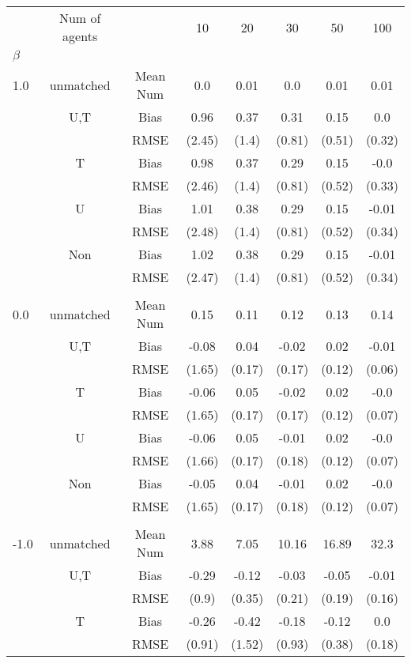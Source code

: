 \begin{tabular}{@{\extracolsep{5pt}}lc|cccccc}
\toprule 
 & Num of agents &  & 10 & 20 & 30 & 50 & 100 \\
$\beta$ &  &  &  &  &  &  &  \\
\midrule 
1.0 & unmatched & Mean Num & 0.0 & 0.01 & 0.0 & 0.01 & 0.01 \\
 & U,T & Bias & 0.96 & 0.37 & 0.31 & 0.15 & 0.0 \\
 &  & RMSE & (2.45) & (1.4) & (0.81) & (0.51) & (0.32) \\
 & T & Bias & 0.98 & 0.37 & 0.29 & 0.15 & -0.0 \\
 &  & RMSE & (2.46) & (1.4) & (0.81) & (0.52) & (0.33) \\
 & U & Bias & 1.01 & 0.38 & 0.29 & 0.15 & -0.01 \\
 &  & RMSE & (2.48) & (1.4) & (0.81) & (0.52) & (0.34) \\
 & Non & Bias & 1.02 & 0.38 & 0.29 & 0.15 & -0.01 \\
 &  & RMSE & (2.47) & (1.4) & (0.81) & (0.52) & (0.34) \\
 &  &  &  &  &  &  &  \\
0.0 & unmatched & Mean Num & 0.15 & 0.11 & 0.12 & 0.13 & 0.14 \\
 & U,T & Bias & -0.08 & 0.04 & -0.02 & 0.02 & -0.01 \\
 &  & RMSE & (1.65) & (0.17) & (0.17) & (0.12) & (0.06) \\
 & T & Bias & -0.06 & 0.05 & -0.02 & 0.02 & -0.0 \\
 &  & RMSE & (1.65) & (0.17) & (0.17) & (0.12) & (0.07) \\
 & U & Bias & -0.06 & 0.05 & -0.01 & 0.02 & -0.0 \\
 &  & RMSE & (1.66) & (0.17) & (0.18) & (0.12) & (0.07) \\
 & Non & Bias & -0.05 & 0.04 & -0.01 & 0.02 & -0.0 \\
 &  & RMSE & (1.65) & (0.17) & (0.18) & (0.12) & (0.07) \\
 &  &  &  &  &  &  &  \\
-1.0 & unmatched & Mean Num & 3.88 & 7.05 & 10.16 & 16.89 & 32.3 \\
 & U,T & Bias & -0.29 & -0.12 & -0.03 & -0.05 & -0.01 \\
 &  & RMSE & (0.9) & (0.35) & (0.21) & (0.19) & (0.16) \\
 & T & Bias & -0.26 & -0.42 & -0.18 & -0.12 & 0.0 \\
 &  & RMSE & (0.91) & (1.52) & (0.93) & (0.38) & (0.18) \\

\end{tabular}
